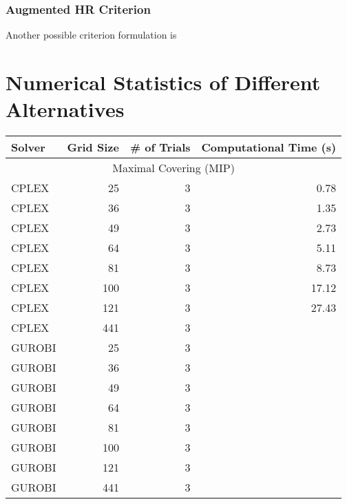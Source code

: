 \documentclass{article}
\begin{document}
	\subsubsection{Augmented HR Criterion}
	Another possible criterion formulation is 
	
	\section{Numerical Statistics of Different Alternatives}
	\begin{table}[]
		\centering
		\begin{tabular}{lrrr}
			\toprule
			Solver & Grid Size & \# of Trials & Computational Time (s) \\
			\midrule
			\multicolumn{4}{c}{Maximal Covering (MIP)}  \\
			CPLEX                       & 25    & 3         & 0.78      \\
			CPLEX                       & 36    & 3         & 1.35      \\
			CPLEX                       & 49    & 3         & 2.73      \\
			CPLEX                       & 64    & 3         & 5.11      \\
			CPLEX                       & 81    & 3         & 8.73      \\
			CPLEX                       & 100   & 3         & 17.12     \\
			CPLEX                       & 121   & 3         & 27.43     \\
			CPLEX                       & 441   & 3         &     \\
			
			GUROBI                      & 25    & 3         &       \\
			GUROBI                      & 36    & 3         &       \\
			GUROBI                      & 49    & 3         &       \\
			GUROBI                      & 64    & 3         &       \\
			GUROBI                      & 81    & 3         &       \\
			GUROBI                      & 100   & 3         &       \\
			GUROBI                      & 121   & 3         &      \\
			GUROBI                      & 441   & 3         &     \\
			

\end{tabular}
\end{table}
\end{document}
